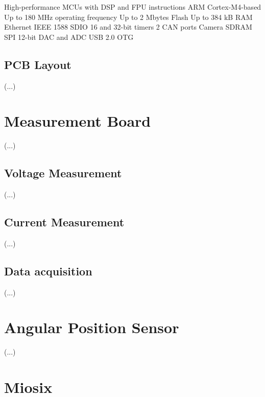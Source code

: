 High-performance MCUs with DSP and FPU instructions
ARM Cortex-M4-based
Up to 180 MHz operating frequency
Up to 2 Mbytes Flash
Up to 384 kB RAM
Ethernet IEEE 1588
SDIO
16 and 32-bit timers
2 CAN ports
Camera
SDRAM
SPI
12-bit DAC and ADC
USB 2.0 OTG


\subsection{PCB Layout}

(...)\\

\lipsum[8]

\section{Measurement Board}

(...)\\

\lipsum[9]

\subsection{Voltage Measurement}

(...)\\

\lipsum[10]

\subsection{Current Measurement}

(...)\\

\lipsum[11]

\subsection{Data acquisition}

(...)\\

\lipsum[12]

\section{Angular Position Sensor}

(...)\\

\lipsum[13]

\section{Miosix}

